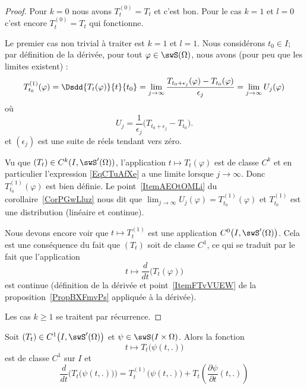\begin{proof}
    Pour \( k=0\) nous avons \( T^{(0)}_t=T_t\) et c'est bon. Pour le cas \( k=1\) et \( l=0\) c'est encore \( T_t^{(0)}=T_t\) qui fonctionne.

    Le premier cas non trivial à traiter est \( k=1\) et \( l=1\). Nous considérons \( t_0\in I\); par définition de la dérivée, pour tout \( \varphi\in\swS(\Omega)\), nous avons (pour peu que les limites existent) :
    \begin{equation}    \label{EqCTuAfXe}
        T^{(1)}_{t_0}(\varphi)=  \Dsdd{ T_t(\varphi) }{t}{t_0}=\lim_{j\to \infty} \frac{ T_{t_0+\epsilon_j}(\varphi)-T_{t_0}(\varphi) }{ \epsilon_j }= \lim_{j\to \infty} U_j(\varphi)
    \end{equation}
    où
    \begin{equation}
        U_j=\frac{1}{ \epsilon_j }\big( T_{t_0+\epsilon_j}-T_{t_0} \big).
    \end{equation}
    et \( (\epsilon_j)\) est une suite de réels tendant vers zéro.

    Vu que \( (T_t)\in C^k(I,\swS'(\Omega))\), l'application \( t\mapsto T_t(\varphi)\) est de classe \( C^k\) et en particulier l'expression \eqref{EqCTuAfXe} a une limite lorsque \( j\to \infty\). Donc \( T^{(1)}_{t_0}(\varphi)\) est bien définie. Le point~\ref{ItemAEOtOMLi} du corollaire~\ref{CorPGwLluz} nous dit que \( \lim_{j\to \infty} U_j(\varphi)= T_{t_0}^{(1)}(\varphi)\) et \( T_{t_0}^{(1)}\) est une distribution (linéaire et continue).

    Nous devons encore voir que \( t\mapsto T^{(1)}_t\) est une application \( C^0\big( I,\swS'(\Omega) \big)\). Cela est une conséquence du fait que \( (T_t)\) soit de classe \( C^1\), ce qui se traduit par le fait que l'application
    \begin{equation}
        t\mapsto \frac{ d }{ dt }\Big( T_t(\varphi) \Big)
    \end{equation}
    est continue (définition de la dérivée et point~\ref{ItemFTvVUEW} de la proposition~\ref{PropBXFmvPs} appliquée à la dérivée).

    Les cas \( k\geq 1\) se traitent par récurrence.
\end{proof}

\begin{proposition} \label{PropUDkgksG}
    Soit \( (T_t)\in C^1\big( I,\swS'(\Omega) \big)\) et \( \psi\in\swS(I\times \Omega)\). Alors la fonction
    \begin{equation}
        t\mapsto T_t\big( \psi(t,.) \big)
    \end{equation}
    est de classe \( C^1\) sur \( I\) et
    \begin{equation}    \label{EqSCNYYhE}
        \frac{ d }{ dt }\Big( T_t\big( \psi(t,.) \big) \Big)=T_t^{(1)}\big( \psi(t,.) \big)+T_t\left( \frac{ \partial \psi }{ \partial t }(t,.) \right)
    \end{equation}
\end{proposition}

